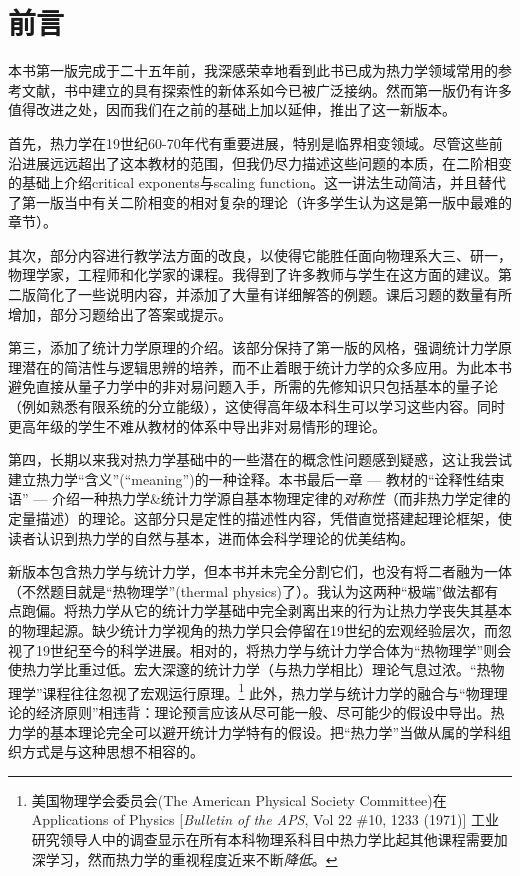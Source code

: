 

\chapter*{前言}
本书第一版完成于二十五年前，我深感荣幸地看到此书已成为热力学领域常用的参考文献，书中建立的具有探索性的新体系如今已被广泛接纳。然而第一版仍有许多值得改进之处，因而我们在之前的基础上加以延伸，推出了这一新版本。

首先，热力学在19世纪60-70年代有重要进展，特别是临界相变领域。尽管这些前沿进展远远超出了这本教材的范围，但我仍尽力描述这些问题的本质，在二阶相变的基础上介绍critical exponents与scaling function。这一讲法生动简洁，并且替代了第一版当中有关二阶相变的相对复杂的理论（许多学生认为这是第一版中最难的章节）。

其次，部分内容进行教学法方面的改良，以使得它能胜任面向物理系大三、研一，物理学家，工程师和化学家的课程。我得到了许多教师与学生在这方面的建议。第二版简化了一些说明内容，并添加了大量有详细解答的例题。课后习题的数量有所增加，部分习题给出了答案或提示。

第三，添加了统计力学原理的介绍。该部分保持了第一版的风格，强调统计力学原理潜在的简洁性与逻辑思辨的培养，而不止着眼于统计力学的众多应用。为此本书避免直接从量子力学中的非对易问题入手，所需的先修知识只包括基本的量子论（例如熟悉有限系统的分立能级），这使得高年级本科生可以学习这些内容。同时更高年级的学生不难从教材的体系中导出非对易情形的理论。

第四，长期以来我对热力学基础中的一些潜在的概念性问题感到疑惑，这让我尝试建立热力学“含义”(``meaning'')的一种诠释。本书最后一章 --- 教材的“诠释性结束语” --- 介绍一种热力学\&统计力学源自基本物理定律的{\it 对称性}（而非热力学定律的定量描述）的理论。这部分只是定性的描述性内容，凭借直觉搭建起理论框架，使读者认识到热力学的自然与基本，进而体会科学理论的优美结构。


新版本包含热力学与统计力学，但本书并未完全分割它们，也没有将二者融为一体（不然题目就是“热物理学”(thermal physics)了）。我认为这两种“极端”做法都有点跑偏。将热力学从它的统计力学基础中完全剥离出来的行为让热力学丧失其基本的物理起源。缺少统计力学视角的热力学只会停留在19世纪的宏观经验层次，而忽视了19世纪至今的科学进展。相对的，将热力学与统计力学合体为“热物理学”则会使热力学比重过低。宏大深邃的统计力学（与热力学相比）理论气息过浓。“热物理学”课程往往忽视了宏观运行原理。\footnote{美国物理学会委员会(The American Physical Society Committee)在 Applications of Physics [{\it Bulletin of the APS}, Vol 22 \#10, 1233 (1971)] 工业研究领导人中的调查显示在所有本科物理系科目中热力学比起其他课程需要加深学习，然而热力学的重视程度近来不断{\it 降低}。} 此外，热力学与统计力学的融合与“物理理论的经济原则”相违背：理论预言应该从尽可能一般、尽可能少的假设中导出。热力学的基本理论完全可以避开统计力学特有的假设。把“热力学”当做从属的学科组织方式是与这种思想不相容的。

